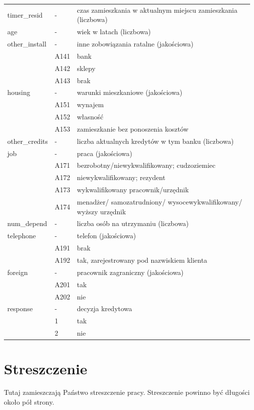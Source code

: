 \documentclass[polish, twoside, 12pt, a4paper]{article}
\theoremstyle{definition}
\theoremstyle{plain}
\theoremstyle{remark}
\begin{document}
\begin{landscape}
{\begin{longtable}{lll}
timer\_resid & - & czas zamieszkania w aktualnym miejscu zamieszkania (liczbowa)\\  
age & - & wiek w latach (liczbowa)\\  
other\_install & - & inne zobowiązania ratalne (jakościowa)\\  
 & A141 & bank\\  
 & A142 & sklepy\\  
 & A143 & brak\\  
housing & - & warunki mieszkaniowe (jakościowa)\\  
 & A151 & wynajem\\  
 & A152 & własność\\  
 & A153 & zamieszkanie bez ponoszenia kosztów\\  
other\_credits & - & liczba aktualnych kredytów w tym banku (liczbowa)\\  
job & - & praca (jakościowa)\\  
 & A171 & bezrobotny/niewykwalifikowany; cudzoziemiec\\  
 & A172 & niewykwalifikowany; rezydent\\  
 & A173 & wykwalifikowany pracownik/urzędnik\\  
 & A174 & menadżer/ samozatrudniony/ wysocewykwalifikowany/ wyższy urzędnik\\  
num\_depend & - & liczba osób na utrzymaniu (liczbowa)\\  
telephone & - & telefon (jakościowa)\\  
 & A191 & brak\\  
 & A192 & tak, zarejestrowany pod nazwiskiem klienta\\  
foreign & - & pracownik zagraniczny (jakościowa)\\  
 & A201 & tak\\  
 & A202 & nie\\  
response & - & decyzja kredytowa\\  
 & 1 & tak\\  
 & 2 & nie\\ 
 \hline
\end{longtable}}
\end{landscape}


\clearpage



\clearpage
{}
\listoftables

\clearpage
{}
\listoffigures



\clearpage
{}
\section*{Streszczenie}

Tutaj zamieszczają Państwo streszczenie pracy. Streszczenie powinno być długości około pół strony.
\end{document}
